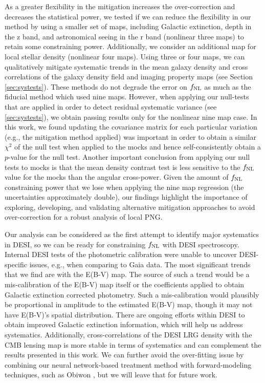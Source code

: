 As a greater flexibility in the mitigation increases the over-correction and decreases the statistical power, we tested if we can reduce the flexibility in our method by using a smaller set of maps, including Galactic extinction, depth in the z band, and astronomical seeing in the r band (nonlinear three maps) to retain some constraining power. Additionally, we consider an additional map for local stellar density (nonlinear four maps). Using three or four maps, we can qualitatively mitigate systematic trends in the mean galaxy density and cross correlations of the galaxy density field and imaging property maps (see Section \ref{sec:systests}). These methods do not degrade the error on $f_{\rm NL}$ as much as the fiducial method which used nine maps. However, when applying our null-tests that are applied in order to detect residual systematic variance (see \ref{sec:systests}), we obtain passing results only for the nonlinear nine map case. In this work, we found updating the covariance matrix for each particular variation (e.g., the mitigation method applied) was important in order to obtain a similar $\chi^2$ of the null test when applied to the mocks and hence self-consistently obtain a $p$-value for the null test. Another important conclusion from applying our null tests to mocks is that the mean density contrast test is less sensitive to the $f_{\rm NL}$ value for the mocks than the angular cross-power. Given the amount of $f_{\rm NL}$ constraining power that we lose when applying the nine map regression (the uncertainties approximately double), our findings highlight the importance of exploring, developing, and validating alternative mitigation approaches to avoid over-correction for a robust analysis of local PNG.

Our analysis can be considered as the first attempt to identify major systematics in DESI, so we can be ready for constraining $f_{\rm NL}$ with DESI spectroscopy. Internal DESI tests of the photometric calibration were unable to uncover DESI-specific issues, e.g., when comparing to Gaia data. The most significant trends that we find are with the E(B-V) map. The source of such a trend would be a mis-calibration of the E(B-V) map itself or the coefficients applied to obtain Galactic extinction corrected photometry. Such a mis-calibration would plausibly be proportional in amplitude to the estimated E(B-V) map, though it may not have E(B-V)’s spatial distribution. There are ongoing efforts within DESI to obtain improved Galactic extinction information, which will help us address systematics. Additionally, cross-correlations of the DESI LRG density with the CMB lensing map is more stable in terms of systematics and can complement the results presented in this work. We can further avoid the over-fitting issue by combining our neural network-based treatment method with forward-modeling techniques, such as Obiwon \citep{kong2020}, but we will leave that for future work.
